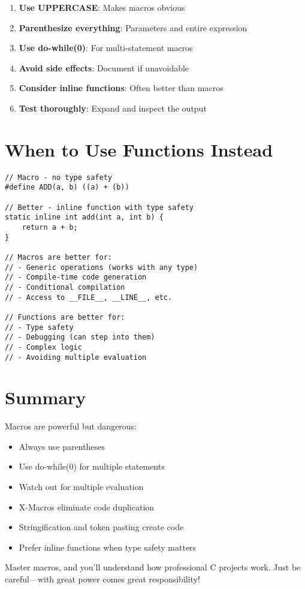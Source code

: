\begin{enumerate}
    \item \textbf{Use UPPERCASE}: Makes macros obvious
    \item \textbf{Parenthesize everything}: Parameters and entire expression
    \item \textbf{Use do-while(0)}: For multi-statement macros
    \item \textbf{Avoid side effects}: Document if unavoidable
    \item \textbf{Consider inline functions}: Often better than macros
    \item \textbf{Test thoroughly}: Expand and inspect the output
\end{enumerate}

\section{When to Use Functions Instead}

\begin{lstlisting}
// Macro - no type safety
#define ADD(a, b) ((a) + (b))

// Better - inline function with type safety
static inline int add(int a, int b) {
    return a + b;
}

// Macros are better for:
// - Generic operations (works with any type)
// - Compile-time code generation
// - Conditional compilation
// - Access to __FILE__, __LINE__, etc.

// Functions are better for:
// - Type safety
// - Debugging (can step into them)
// - Complex logic
// - Avoiding multiple evaluation
\end{lstlisting}

\section{Summary}

Macros are powerful but dangerous:

\begin{itemize}
    \item Always use parentheses
    \item Use do-while(0) for multiple statements
    \item Watch out for multiple evaluation
    \item X-Macros eliminate code duplication
    \item Stringification and token pasting create code
    \item Prefer inline functions when type safety matters
\end{itemize}

Master macros, and you'll understand how professional C projects work. Just be careful---with great power comes great responsibility!
